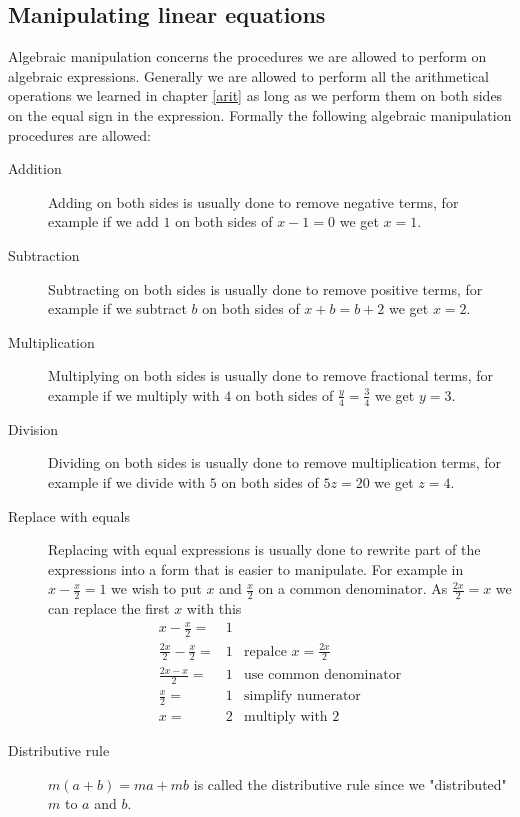 \subsection{Manipulating linear equations}
Algebraic manipulation concerns the procedures we are allowed to perform on algebraic expressions. Generally we are allowed to perform all the arithmetical operations we learned in chapter \ref{arit} as long as we perform them on both sides on the equal sign in the expression. Formally the following algebraic manipulation procedures are allowed:
\begin{description}
\item [Addition] Adding on both sides is usually done to remove negative terms, for example if we add $1$ on both sides of $x - 1 = 0$ we get $x = 1$.
\item [Subtraction] Subtracting on both sides is usually done to remove positive terms, for example if we subtract $b$ on both sides of $x + b = b + 2$ we get $x = 2$.
\item [Multiplication] Multiplying on both sides is usually done to remove fractional terms, for example if we multiply with $4$ on both sides of $\frac{y}{4} = \frac{3}{4}$ we get $y = 3$.
\item [Division] Dividing on both sides is usually done to remove multiplication terms, for example if we divide with $5$ on both sides of $5z = 20$ we get $z = 4$.
\item [Replace with equals] Replacing with equal expressions is usually done to rewrite part of the expressions into a form that is easier to manipulate. For example in $x - \frac{x}{2} = 1$ we wish to put $x$ and $\frac{x}{2}$ on a common denominator. As $\frac{2x}{2} = x$ we can replace the first $x$ with this
\begin{align*}
x - \frac{x}{2}            =& 1 &                                     \\
\frac{2x}{2} - \frac{x}{2} =& 1 & \textrm{repalce $x = \frac{2x}{2}$} \\
\frac{2x - x}{2}           =& 1 & \textrm{use common denominator}     \\
\frac{x}{2}                =& 1 & \textrm{simplify numerator}         \\
x                          =& 2 & \textrm{multiply with $2$}
\end{align*}
\item [Distributive rule] $m(a + b) = ma + mb$ is called the distributive rule since we "distributed" $m$ to $a$ and $b$.
\end{description}

